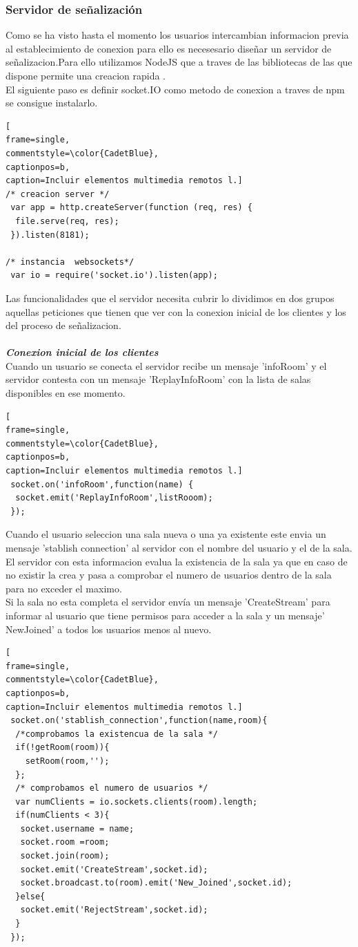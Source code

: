 \subsubsection{Servidor de señalización}
Como se ha visto hasta el momento los usuarios intercambian informacion previa al establecimiento de conexion para ello es necesesario diseñar un servidor de señalizacion.Para ello  utilizamos NodeJS que a traves de las bibliotecas de las que dispone permite una creacion rapida . 
\\El siguiente paso es definir socket.IO como metodo de conexion a traves de npm se consigue instalarlo.
\begin{lstlisting}[
frame=single,
commentstyle=\color{CadetBlue},
captionpos=b,
caption=Incluir elementos multimedia remotos l.]
/* creacion server */
 var app = http.createServer(function (req, res) {
  file.serve(req, res);
 }).listen(8181);
 
/* instancia  websockets*/
 var io = require('socket.io').listen(app);
\end{lstlisting}
Las funcionalidades que el servidor necesita cubrir lo dividimos en dos grupos aquellas peticiones que tienen que ver con la conexion inicial de los clientes y los del proceso de señalizacion.
\\
\\\textit{\textbf{Conexion inicial de los clientes}}
\\Cuando un usuario se conecta el servidor recibe un mensaje  'infoRoom' y el servidor contesta con un mensaje 'ReplayInfoRoom' con la lista de salas disponibles en ese momento.
\begin{lstlisting}[
frame=single,
commentstyle=\color{CadetBlue},
captionpos=b,
caption=Incluir elementos multimedia remotos l.]
 socket.on('infoRoom',function(name) {
  socket.emit('ReplayInfoRoom',listRooom);
 });
\end{lstlisting}
Cuando el usuario seleccion una sala nueva o una ya existente este envia un mensaje 'stablish connection' al servidor con el nombre del usuario y el de la sala.\\El servidor con esta informacion evalua la existencia de la sala ya que en caso de no existir la crea y pasa a comprobar el numero de usuarios dentro de la sala para no exceder el maximo.
\\Si la sala no esta completa el servidor envía un mensaje 'CreateStream' para informar al usuario que tiene permisos para acceder a la sala y un mensaje' NewJoined' a todos los usuarios menos al nuevo.
\begin{lstlisting}[
frame=single,
commentstyle=\color{CadetBlue},
captionpos=b,
caption=Incluir elementos multimedia remotos l.]
 socket.on('stablish_connection',function(name,room){
  /*comprobamos la existencua de la sala */
  if(!getRoom(room)){
    setRoom(room,'');
  };
  /* comprobamos el numero de usuarios */
  var numClients = io.sockets.clients(room).length;
  if(numClients < 3){
   socket.username = name;
   socket.room =room;
   socket.join(room);
   socket.emit('CreateStream',socket.id);
   socket.broadcast.to(room).emit('New_Joined',socket.id);
  }else{
   socket.emit('RejectStream',socket.id);
  }
 });
\end{lstlisting}
